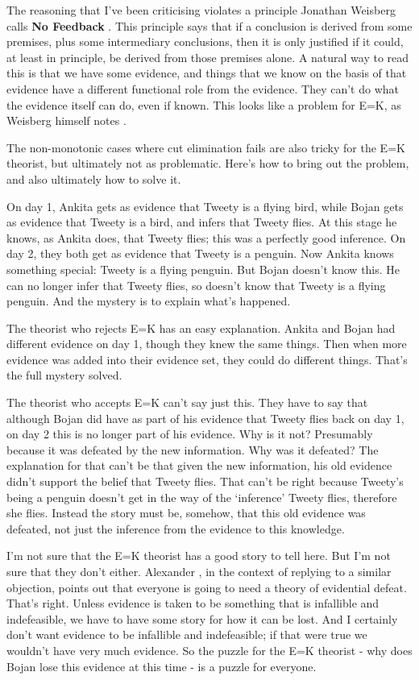 \documentclass[11pt,]{book}
\begin{document}
The reasoning that I've been criticising violates a principle Jonathan Weisberg calls \textbf{No Feedback} \citep[ 533-4]{Weisberg2010}. This principle says that if a conclusion is derived from some premises, plus some intermediary conclusions, then it is only justified if it could, at least in principle, be derived from those premises alone. A natural way to read this is that we have some evidence, and things that we know on the basis of that evidence have a different functional role from the evidence. They can't do what the evidence itself can do, even if known. This looks like a problem for E=K, as Weisberg himself notes \citeyearpar[ 536]{Weisberg2010}.

The non-monotonic cases where cut elimination fails are also tricky for the E=K theorist, but ultimately not as problematic. Here's how to bring out the problem, and also ultimately how to solve it.

On day 1, Ankita gets as evidence that Tweety is a flying bird, while Bojan gets as evidence that Tweety is a bird, and infers that Tweety flies. At this stage he knows, as Ankita does, that Tweety flies; this was a perfectly good inference. On day 2, they both get as evidence that Tweety is a penguin. Now Ankita knows something special: Tweety is a flying penguin. But Bojan doesn't know this. He can no longer infer that Tweety flies, so doesn't know that Tweety is a flying penguin. And the mystery is to explain what's happened.

The theorist who rejects E=K has an easy explanation. Ankita and Bojan had different evidence on day 1, though they knew the same things. Then when more evidence was added into their evidence set, they could do different things. That's the full mystery solved.

The theorist who accepts E=K can't say just this. They have to say that although Bojan did have as part of his evidence that Tweety flies back on day 1, on day 2 this is no longer part of his evidence. Why is it not? Presumably because it was defeated by the new information. Why was it defeated? The explanation for that can't be that given the new information, his old evidence didn't support the belief that Tweety flies. That can't be right because Tweety's being a penguin doesn't get in the way of the `inference' Tweety flies, therefore she flies. Instead the story must be, somehow, that this old evidence was defeated, not just the inference from the evidence to this knowledge.

I'm not sure that the E=K theorist has a good story to tell here. But I'm not sure that they don't either. Alexander \citet{Bird2004}, in the context of replying to a similar objection, points out that everyone is going to need a theory of evidential defeat. That's right. Unless evidence is taken to be something that is infallible and indefeasible, we have to have some story for how it can be lost. And I certainly don't want evidence to be infallible and indefeasible; if that were true we wouldn't have very much evidence. So the puzzle for the E=K theorist - why does Bojan lose this evidence at this time - is a puzzle for everyone.
\end{document}
